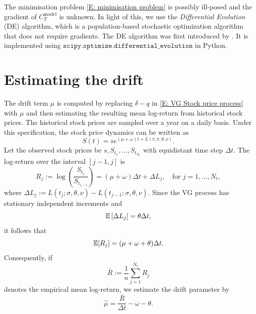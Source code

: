 The minimisation problem \eqref{E: minimisation problem} is possibly ill-posed and the gradient of $C_T^{\text{model}}$ is unknown. In light of this, we use the \emph{Differential Evolution} (DE) algorithm, which is a population-based stochastic optimization algorithm that does not require gradients. The DE algorithm was first introduced by \textcite{storn1997differential}. It is implemented using $\texttt{scipy.optimize.differential\_evolution}$ in Python.

\section{Estimating the drift}
\label{appendix: Estimating the drift}
The drift term $\mu$ is computed by replacing $\delta -q$ in \eqref{E: VG Stock price process} with $\mu$ and then estimating the resulting mean log-return from historical stock prices. The historical stock prices are sampled over a year on a daily basis. Under this specification, the stock price dynamics can be written as 
\begin{equation*}
    S(t) = se^{(\mu+\omega)t + L(t; \sigma, \theta, \nu)} .
\end{equation*}
Let the observed stock prices be $s, S_{t_1}, \ldots, S_{t_{N_t}}$ with equidistant time step $\Delta t$. The log-return over the interval $[j-1,j]$ is 
\begin{equation*}
    R_j := \log \left(\frac{S_{t_j}}{S_{t_{j-1}}}\right) = (\mu + \omega) \Delta t + \Delta L_j, \quad \text{for } j=1, \ldots, N_t,
\end{equation*}
where $\Delta L_j := L(t_j; \sigma, \theta, \nu) - L(t_{j-1}; \sigma, \theta, \nu)$. Since the VG process has stationary independent increments and 
\begin{equation*}
    \mathbb{E} \left[\Delta L_j\right] = \theta \Delta t,
\end{equation*}
it follows that 
\begin{equation*}
    \mathbb{E} [R_j] = (\mu + \omega + \theta) \Delta t.
\end{equation*}
Consequently, if 
\begin{equation*}
    \bar R := \frac{1}{n} \sum_{j=1}^{N_t} R_j
\end{equation*}
denotes the empirical mean log-return, we estimate the drift parameter by
\begin{equation*}
    \hat \mu = \frac{\bar R}{\Delta t} - \omega - \theta.
\end{equation*}